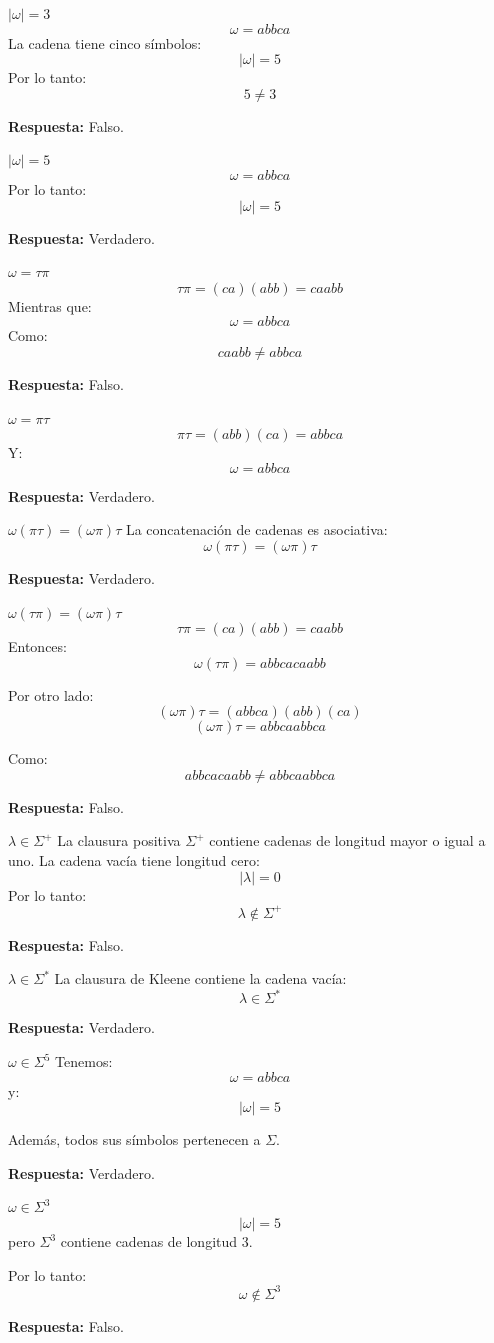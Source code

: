 \documentclass[12pt]{article}
\begin{document}
\textbf{$\lvert\omega\rvert=3$}
\[
\omega=abbca
\]
La cadena tiene cinco símbolos:
\[
\lvert\omega\rvert=5
\]
Por lo tanto:
\[
5\neq3
\]

\textbf{Respuesta:} Falso.


\textbf{$\lvert\omega\rvert=5$}
\[
\omega=abbca
\]
Por lo tanto:
\[
\lvert\omega\rvert=5
\]

\textbf{Respuesta:} Verdadero.

\textbf{$\omega=\tau\pi$ }
\[
\tau\pi=(ca)(abb)=caabb
\]
Mientras que:
\[
\omega=abbca
\]
Como:
\[
caabb\neq abbca
\]

\textbf{Respuesta:} Falso.

 \textbf{$\omega=\pi\tau$}
 \[
\pi\tau=(abb)(ca)=abbca
\]
Y:
\[
\omega=abbca
\]

\textbf{Respuesta:} Verdadero.

\textbf{$\omega(\pi\tau)=(\omega\pi)\tau$}
La concatenación de cadenas es asociativa:
\[
\omega(\pi\tau)=(\omega\pi)\tau
\]

\textbf{Respuesta:} Verdadero.

\textbf{$\omega(\tau\pi)=(\omega\pi)\tau$}
\[
\tau\pi=(ca)(abb)=caabb
\]
Entonces:
\[
\omega(\tau\pi)=abbcacaabb
\]

Por otro lado:
\[
(\omega\pi)\tau=(abbca)(abb)(ca)
\]
\[
(\omega\pi)\tau=abbcaabbca
\]

Como:
\[
abbcacaabb\neq abbcaabbca
\]

\textbf{Respuesta:} Falso.

\textbf{$\lambda\in\Sigma^+$}
La clausura positiva $\Sigma^+$ contiene cadenas de longitud mayor o igual a uno.
La cadena vacía tiene longitud cero:
\[
|\lambda|=0
\]
Por lo tanto:
\[
\lambda\notin\Sigma^+
\]

\textbf{Respuesta:} Falso.

\textbf{$\lambda\in\Sigma^*$}
La clausura de Kleene contiene la cadena vacía:
\[
\lambda\in\Sigma^*
\]

\textbf{Respuesta:} Verdadero.

\textbf{$\omega\in\Sigma^5$ }
Tenemos:
\[
\omega=abbca
\]
y:
\[
|\omega|=5
\]

Además, todos sus símbolos pertenecen a $\Sigma$.

\textbf{Respuesta:} Verdadero.

\textbf{$\omega\in\Sigma^3$}
\[
|\omega|=5
\]
pero $\Sigma^3$ contiene cadenas de longitud 3.

Por lo tanto:
\[
\omega\notin\Sigma^3
\]

\textbf{Respuesta:} Falso.
\end{document}
